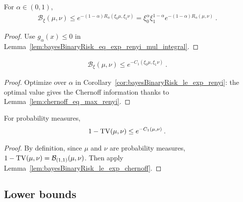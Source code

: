 \begin{corollary}
  \label{cor:bayesBinaryRisk_le_exp_renyi}
  For $\alpha \in (0,1)$,
  \begin{align*}
  \mathcal B_\xi(\mu, \nu)
  \le e^{-(1 - \alpha) R_\alpha(\xi_0\mu, \xi_1\nu)}
  = \xi_0^\alpha \xi_1^{1-\alpha} e^{-(1 - \alpha) R_\alpha(\mu, \nu)}
  \: .
  \end{align*}
\end{corollary}

\begin{proof}%
{}
Use $g_\alpha(x) \le 0$ in Lemma~\ref{lem:bayesBinaryRisk_eq_exp_renyi_mul_integral}.
\end{proof}


\begin{lemma}
  \label{lem:bayesBinaryRisk_le_exp_chernoff}
  \begin{align*}
  \mathcal B_\xi(\mu, \nu)
  \le e^{- C_1(\xi_0\mu, \xi_1\nu)}
  \: .
  \end{align*}
\end{lemma}

\begin{proof}%
{}
Optimize over $\alpha$ in Corollary~\ref{cor:bayesBinaryRisk_le_exp_renyi}: the optimal value gives the Chernoff information thanks to Lemma~\ref{lem:chernoff_eq_max_renyi}.
\end{proof}


\begin{lemma}
  \label{lem:one_sub_tv_le_exp_chernoff}
  For probability measures,
  \begin{align*}
  1 - \operatorname{TV}(\mu, \nu) \le e^{- C_1(\mu, \nu)} \: .
  \end{align*}
\end{lemma}

\begin{proof}%
{}
By definition, since $\mu$ and $\nu$ are probability measures, $1 - \operatorname{TV}(\mu, \nu) = \mathcal B_{(1,1)}(\mu, \nu)$. Then apply Lemma~\ref{lem:bayesBinaryRisk_le_exp_chernoff}.
\end{proof}



\subsection{Lower bounds}

